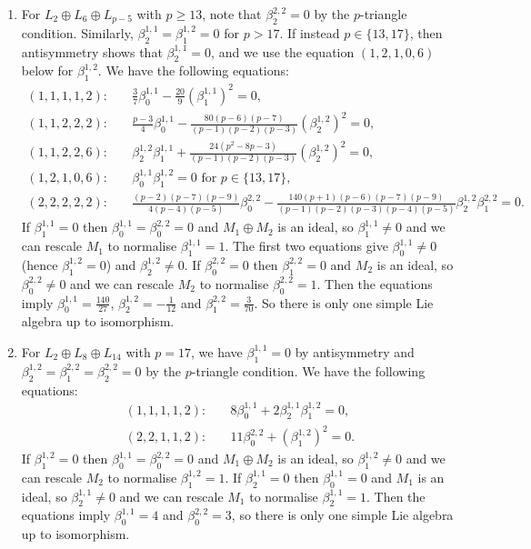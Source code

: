 \documentclass[11pt,a4paper,reqno]{amsart}
\theoremstyle{definition}
\numberwithin{equation}{section}
\begin{document}
\begin{enumerate}
\item For $L_2\oplus L_6\oplus L_{p-5}$ with $p\geq13$, note that $\beta^{2,2}_2=0$ by the $p$-triangle condition. Similarly, $\beta^{1,1}_2=\beta^{1,2}_1=0$ for $p>17$. If instead $p\in\{13,17\}$, then antisymmetry shows that $\beta^{1,1}_2=0$, and we use the equation $(1,2,1,0,6)$ below for $\beta^{1,2}_1$. We have the following equations:
\begin{align*}
(1,1,1,1,2):\quad&\textstyle \frac37\beta^{1,1}_0-\frac{20}9(\beta^{1,1}_1)^2=0,\\
(1,1,2,2,2):\quad&\textstyle \frac{p-3}4\beta^{1,1}_0-\frac{80(p-6)(p-7)}{(p-1)(p-2)(p-3)}(\beta^{1,2}_2)^2=0,\\
(1,1,2,2,6):\quad&\textstyle \beta^{1,2}_2\beta^{1,1}_1+\frac{24(p^2-8p-3)}{(p-1)(p-2)(p-3)}(\beta^{1,2}_2)^2=0,\\
(1,2,1,0,6):\quad&\textstyle \beta^{1,1}_0\beta^{1,2}_1=0\text{ for }p\in\{13,17\},\\
(2,2,2,2,2):\quad&\textstyle \frac{(p-2)(p-7)(p-9)}{4(p-4)(p-5)}\beta^{2,2}_0-\frac{140(p+1)(p-6)(p-7)(p-9)}{(p-1)(p-2)(p-3)(p-4)(p-5)}\beta^{1,2}_2\beta^{2,2}_1=0.
\end{align*}
If $\beta^{1,1}_1=0$ then $\beta^{1,1}_0=\beta^{2,2}_0=0$ and $M_1\oplus M_2$ is an ideal, so $\beta^{1,1}_1\neq0$ and we can rescale $M_1$ to normalise $\beta^{1,1}_1=1$. The first two equations give $\beta^{1,1}_0\neq0$ (hence $\beta^{1,2}_1=0$) and $\beta^{1,2}_2\neq0$. If $\beta^{2,2}_0=0$ then $\beta^{2,2}_1=0$ and $M_2$ is an ideal, so $\beta^{2,2}_0\neq0$ and we can rescale $M_2$ to normalise $\beta^{2,2}_0=1$. Then the equations imply $\beta^{1,1}_0=\frac{140}{27}$, $\beta^{1,2}_2=-\frac1{12}$ and $\beta^{2,2}_1=\frac3{70}$. So there is only one simple Lie algebra up to isomorphism.

\item For $L_2\oplus L_8\oplus L_{14}$ with $p=17$, we have $\beta^{1,1}_1=0$ by antisymmetry and $\beta^{1,2}_2=\beta^{2,2}_1=\beta^{2,2}_2=0$ by the $p$-triangle condition. We have the following equations:
\begin{align*}
(1,1,1,1,2):\quad&\textstyle 8\beta^{1,1}_0+2\beta^{1,1}_2\beta^{1,2}_1=0,\\
(2,2,1,1,2):\quad&\textstyle 11\beta^{2,2}_0+(\beta^{1,2}_1)^2=0.
\end{align*}
If $\beta^{1,2}_1=0$ then $\beta^{1,1}_0=\beta^{2,2}_0=0$ and $M_1\oplus M_2$ is an ideal, so $\beta^{1,2}_1\neq0$ and we can rescale $M_2$ to normalise $\beta^{1,2}_1=1$. If $\beta^{1,1}_2=0$ then $\beta^{1,1}_0=0$ and $M_1$ is an ideal, so $\beta^{1,1}_2\neq0$ and we can rescale $M_1$ to normalise $\beta^{1,1}_2=1$. Then the equations imply $\beta^{1,1}_0=4$ and $\beta^{2,2}_0=3$, so there is only one simple Lie algebra up to isomorphism.
 

\end{enumerate}
\end{document}

